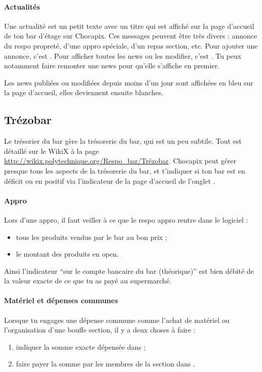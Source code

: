 \documentclass[12pt,french]{article}
\begin{document}
\paragraph{Actualités} Une actualité est un petit texte avec un titre qui est affiché sur la page d'accueil de ton bar d'étage sur Chocapix. Ces messages peuvent être très divers : annonce du respo propreté, d'une appro spéciale, d'un repas section, etc. Pour ajouter une annonce, c'est . Pour afficher toutes les news ou les modifier, c'est . Tu peux notamment faire remonter une news pour qu'elle s'affiche en premier.

Les news publiées ou modifiées depuis moins d'un jour sont affichées en bleu sur la page d'accueil, elles deviennent ensuite blanches.

\subsection{Trézobar}

Le trésorier du bar gère la trésorerie du bar, qui est un peu subtile. Tout est détaillé sur le WikiX à la page \url{http://wikix.polytechnique.org/Respo_bar/Trézobar}. Chocapix peut gérer presque tous les aspects de la trésorerie du bar, et t'indiquer si ton bar est en déficit ou en positif via l'indicateur de la page d'accueil de l'onglet .

\paragraph{Appro} Lors d'une appro, il faut veiller à ce que le respo appro rentre dans le logiciel :
\begin{itemize}
	\item tous les produits vendus par le bar au bon prix ;
	\item le montant des produits en open.
\end{itemize}
Ainsi l'indicateur \enquote{sur le compte bancaire du bar (théorique)}  est bien débité de la valeur exacte de ce que tu as payé au supermarché.

\paragraph{Matériel et dépenses communes} Lorsque tu engages une dépense commune comme l'achat de matériel ou l'organisation d'une bouffe section, il y a deux choses à faire :
\begin{enumerate}
	\item indiquer la somme exacte dépensée dans  ;
	\item faire payer la somme par les membres de la section dans .
\end{enumerate}
\end{document}

